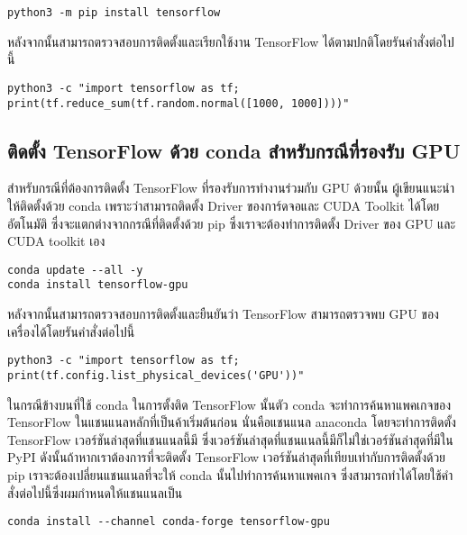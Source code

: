 \begin{lstlisting}[style=MyBash]
python3 -m pip install tensorflow
\end{lstlisting}

\vspace{1em}
หลังจากนั้นสามารถตรวจสอบการติดตั้งและเรียกใช้งาน TensorFlow ได้ตามปกติโดยรันคำสั่งต่อไปนี้

\begin{lstlisting}[style=MyBash]
python3 -c "import tensorflow as tf; print(tf.reduce_sum(tf.random.normal([1000, 1000])))"
\end{lstlisting}

\subsection{ติดตั้ง TensorFlow ด้วย conda สำหรับกรณีที่รองรับ GPU}

สำหรับกรณีที่ต้องการติดตั้ง TensorFlow ที่รองรับการทำงานร่วมกับ GPU ด้วยนั้น ผู้เขียนแนะนำให้ติดตั้งด้วย conda เพราะว่าสามารถติดตั้ง Driver ของการ์ดจอและ CUDA Toolkit ได้โดยอัตโนมัติ ซึ่งจะแตกต่างจากกรณีที่ติดตั้งด้วย pip ซึ่งเราจะต้องทำการติดตั้ง Driver ของ GPU และ CUDA toolkit เอง

\begin{lstlisting}[style=MyBash]
conda update --all -y
conda install tensorflow-gpu
\end{lstlisting}

\vspace{1em}

หลังจากนั้นสามารถตรวจสอบการติดตั้งและยืนยันว่า TensorFlow สามารถตรวจพบ GPU ของเครื่องได้โดยรันคำสั่งต่อไปนี้

\begin{lstlisting}[style=MyBash]
python3 -c "import tensorflow as tf; print(tf.config.list_physical_devices('GPU'))"
\end{lstlisting}

\vspace{1em}

ในกรณีข้างบนที่ใช้ conda ในการตั้งติด TensorFlow นั้นตัว conda จะทำการค้นหาแพคเกจของ TensorFlow ในแชนแนลหลักที่เป็นค้าเริ่มต้นก่อน นั่นคือแชนแนล anaconda โดยจะทำการติดตั้ง TensorFlow เวอร์ชันล่าสุดที่แชนแนลนี้มี ซึ่งเวอร์ชันล่าสุดที่แชนแนลนี้มีก็ไม่ใช่เวอร์ชันล่าสุดที่มีใน PyPI ดังนั้นถ้าหากเราต้องการที่จะติดตั้ง TensorFlow เวอร์ชันล่าสุดที่เทียบเท่ากับการติดตั้งด้วย pip เราจะต้องเปลี่ยนแชนแนลที่จะให้ conda นั้นไปทำการค้นหาแพคเกจ ซึ่งสามารถทำได้โดยใช้คำสั่งต่อไปนี้ซึ่งผมกำหนดให้แชนแนลเป็น 

\begin{lstlisting}[style=MyBash]
    conda install --channel conda-forge tensorflow-gpu
\end{lstlisting}
